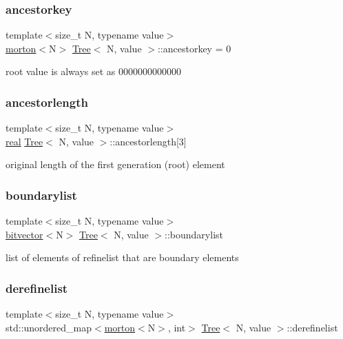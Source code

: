 \subsubsection{\texorpdfstring{ancestorkey}{ancestorkey}}
{\footnotesize\ttfamily template$<$size\+\_\+t N, typename value$>$ \\
\mbox{\hyperlink{definitions_8h_af8682350bd8bb38ee9023f7a0a310add}{morton}}$<$N$>$ \mbox{\hyperlink{classTree}{Tree}}$<$ N, value $>$\+::ancestorkey = 0\hspace{0.3cm}{\ttfamily [protected]}}

root value is always set as 0000000000000 \mbox{\label{classTree_a6dd200497bd886db369d621cc05af09f}} 
\subsubsection{\texorpdfstring{ancestorlength}{ancestorlength}}
{\footnotesize\ttfamily template$<$size\+\_\+t N, typename value$>$ \\
\mbox{\hyperlink{definitions_8h_aedc0ad84d1e764530814f57ad931d02a}{real}} \mbox{\hyperlink{classTree}{Tree}}$<$ N, value $>$\+::ancestorlength\mbox{[}3\mbox{]}\hspace{0.3cm}{\ttfamily [protected]}}

original length of the first generation (root) element \mbox{\label{classTree_aa9c837fabf42230cfd53775130886cc6}} 
\subsubsection{\texorpdfstring{boundarylist}{boundarylist}}
{\footnotesize\ttfamily template$<$size\+\_\+t N, typename value$>$ \\
\mbox{\hyperlink{definitions_8h_a55821d7929f3f16aaf1466129c209492}{bitvector}}$<$N$>$ \mbox{\hyperlink{classTree}{Tree}}$<$ N, value $>$\+::boundarylist}

list of elements of refinelist that are boundary elements \mbox{\label{classTree_acfb17b257f964def045244fbd73f8c6c}} 
\subsubsection{\texorpdfstring{derefinelist}{derefinelist}}
{\footnotesize\ttfamily template$<$size\+\_\+t N, typename value$>$ \\
std\+::unordered\+\_\+map$<$\mbox{\hyperlink{definitions_8h_af8682350bd8bb38ee9023f7a0a310add}{morton}}$<$N$>$, int$>$ \mbox{\hyperlink{classTree}{Tree}}$<$ N, value $>$\+::derefinelist\hspace{0.3cm}{\ttfamily [private]}}

